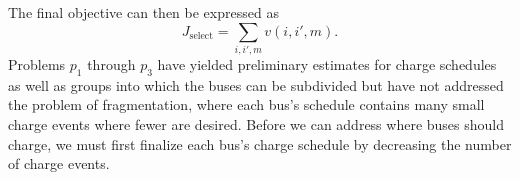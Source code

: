 The final objective can then be expressed as
\begin{equation}\label{eqn:groups:objective}
	J_{\text{select}} = \sum_{i,i',m} v(i,i',m).
\end{equation} 
Problems $p_1$ through $p_3$ have yielded preliminary estimates for charge schedules as well as groups into which the buses can be subdivided but have not addressed the problem of fragmentation, where each bus's schedule contains many small charge events where fewer are desired. Before we can address where buses should charge, we must first finalize each bus's charge schedule by decreasing the number of charge events.  
\\[0.1in] 



